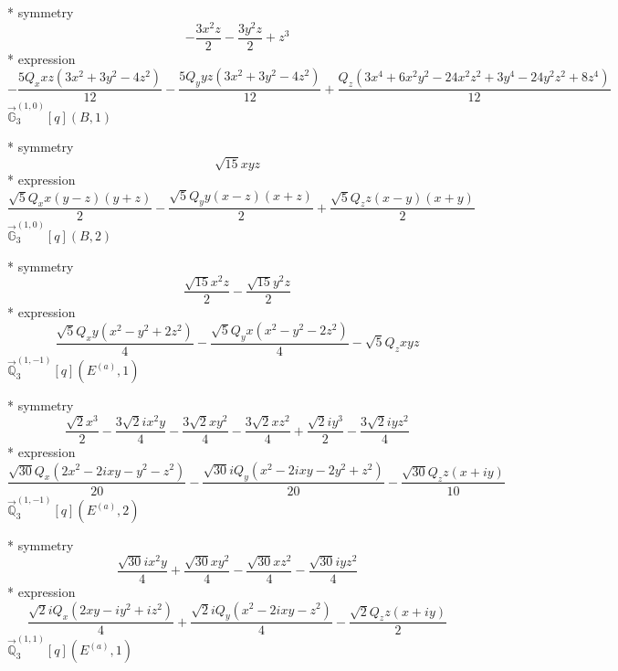 \documentclass[fleqn,8pt]{jsarticle}
\begin{document}
\noindent\quad ** symmetry
\begin{dmath*}
- \frac{3 x^{2} z}{2} - \frac{3 y^{2} z}{2} + z^{3}
\end{dmath*}
\noindent\quad ** expression
\begin{dmath*}
- \frac{5 Q_{x} x z \left(3 x^{2} + 3 y^{2} - 4 z^{2}\right)}{12} - \frac{5 Q_{y} y z \left(3 x^{2} + 3 y^{2} - 4 z^{2}\right)}{12} + \frac{Q_{z} \left(3 x^{4} + 6 x^{2} y^{2} - 24 x^{2} z^{2} + 3 y^{4} - 24 y^{2} z^{2} + 8 z^{4}\right)}{12}
\end{dmath*}
\noindent\quad $\vec{\mathbb{G}}_{3}^{(1,0)}[q](B,1)$

\noindent\quad ** symmetry
\begin{dmath*}
\sqrt{15} x y z
\end{dmath*}
\noindent\quad ** expression
\begin{dmath*}
\frac{\sqrt{5} Q_{x} x \left(y - z\right) \left(y + z\right)}{2} - \frac{\sqrt{5} Q_{y} y \left(x - z\right) \left(x + z\right)}{2} + \frac{\sqrt{5} Q_{z} z \left(x - y\right) \left(x + y\right)}{2}
\end{dmath*}
\noindent\quad $\vec{\mathbb{G}}_{3}^{(1,0)}[q](B,2)$

\noindent\quad ** symmetry
\begin{dmath*}
\frac{\sqrt{15} x^{2} z}{2} - \frac{\sqrt{15} y^{2} z}{2}
\end{dmath*}
\noindent\quad ** expression
\begin{dmath*}
\frac{\sqrt{5} Q_{x} y \left(x^{2} - y^{2} + 2 z^{2}\right)}{4} - \frac{\sqrt{5} Q_{y} x \left(x^{2} - y^{2} - 2 z^{2}\right)}{4} - \sqrt{5} Q_{z} x y z
\end{dmath*}
\noindent\quad $\vec{\mathbb{Q}}_{3}^{(1,-1)}[q](E^{(a)},1)$

\noindent\quad ** symmetry
\begin{dmath*}
\frac{\sqrt{2} x^{3}}{2} - \frac{3 \sqrt{2} i x^{2} y}{4} - \frac{3 \sqrt{2} x y^{2}}{4} - \frac{3 \sqrt{2} x z^{2}}{4} + \frac{\sqrt{2} i y^{3}}{2} - \frac{3 \sqrt{2} i y z^{2}}{4}
\end{dmath*}
\noindent\quad ** expression
\begin{dmath*}
\frac{\sqrt{30} Q_{x} \left(2 x^{2} - 2 i x y - y^{2} - z^{2}\right)}{20} - \frac{\sqrt{30} i Q_{y} \left(x^{2} - 2 i x y - 2 y^{2} + z^{2}\right)}{20} - \frac{\sqrt{30} Q_{z} z \left(x + i y\right)}{10}
\end{dmath*}
\noindent\quad $\vec{\mathbb{Q}}_{3}^{(1,-1)}[q](E^{(a)},2)$

\noindent\quad ** symmetry
\begin{dmath*}
\frac{\sqrt{30} i x^{2} y}{4} + \frac{\sqrt{30} x y^{2}}{4} - \frac{\sqrt{30} x z^{2}}{4} - \frac{\sqrt{30} i y z^{2}}{4}
\end{dmath*}
\noindent\quad ** expression
\begin{dmath*}
\frac{\sqrt{2} i Q_{x} \left(2 x y - i y^{2} + i z^{2}\right)}{4} + \frac{\sqrt{2} i Q_{y} \left(x^{2} - 2 i x y - z^{2}\right)}{4} - \frac{\sqrt{2} Q_{z} z \left(x + i y\right)}{2}
\end{dmath*}
\noindent\quad $\vec{\mathbb{Q}}_{3}^{(1,1)}[q](E^{(a)},1)$
\end{document}
